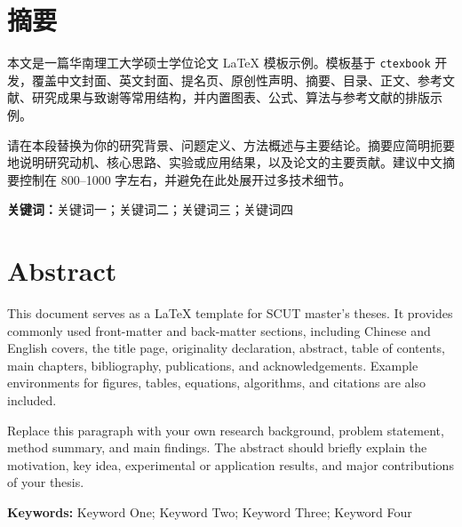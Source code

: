 \chapter[摘要]{摘\quad 要}
\setlength{\parindent}{2em}

本文是一篇华南理工大学硕士学位论文 \LaTeX{} 模板示例。模板基于 \texttt{ctexbook} 开发，覆盖中文封面、英文封面、提名页、原创性声明、摘要、目录、正文、参考文献、研究成果与致谢等常用结构，并内置图表、公式、算法与参考文献的排版示例。

请在本段替换为你的研究背景、问题定义、方法概述与主要结论。摘要应简明扼要地说明研究动机、核心思路、实验或应用结果，以及论文的主要贡献。建议中文摘要控制在 800--1000 字左右，并避免在此处展开过多技术细节。

\par \vspace{1em}
\noindent \textbf{关键词：}关键词一；关键词二；关键词三；关键词四


\chapter[Abstract]{Abstract}

This document serves as a \LaTeX{} template for SCUT master's theses. It provides commonly used front-matter and back-matter sections, including Chinese and English covers, the title page, originality declaration, abstract, table of contents, main chapters, bibliography, publications, and acknowledgements. Example environments for figures, tables, equations, algorithms, and citations are also included.

Replace this paragraph with your own research background, problem statement, method summary, and main findings. The abstract should briefly explain the motivation, key idea, experimental or application results, and major contributions of your thesis.

\par \vspace{1em}
\noindent \textbf{Keywords:} Keyword One; Keyword Two; Keyword Three; Keyword Four

\setlength{\parindent}{2em}
